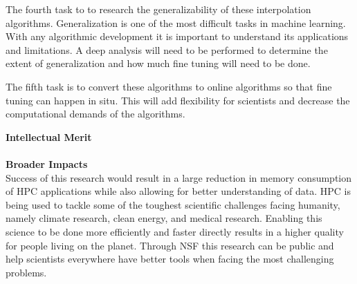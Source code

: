 \documentclass[12pt]{article}
\begin{document}
\noindent The fourth task to to research the generalizability of these
interpolation algorithms. Generalization is one of the most difficult tasks in
machine learning. With any algorithmic development it is important to understand
its applications and limitations. A deep analysis will need to be performed to
determine the extent of generalization and how much fine tuning will need to be
done. 

\noindent The fifth task is to convert these algorithms to online algorithms so
that fine tuning can happen in situ. This will add flexibility for scientists
and decrease the computational demands of the algorithms. 

\noindent
\textbf{Intellectual Merit}
\\\noindent
%
\\\textbf{Broader Impacts} 
\\\noindent
Success of this research would result in a large reduction in memory consumption
of HPC applications while also allowing for better understanding of data. HPC is
being used to tackle some of the toughest scientific challenges facing humanity,
namely climate research, clean energy, and medical research. Enabling this
science to be done more efficiently and faster directly results in a higher
quality for people living on the planet. Through NSF this research can be public
and help scientists everywhere have better tools when facing the most
challenging problems.


\footnotesize


%
%
\end{document}
